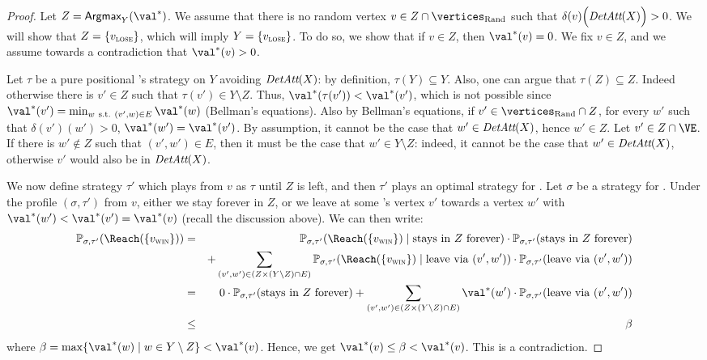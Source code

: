\begin{proof}
  Let $Z = \textsf{Argmax}_Y (\val^*)$. We assume that there is no
  random vertex $v \in Z \cap \Randomvertices$ such that
  $\delta(v)\Big(\textit{DetAtt}(X)\Big)>0$. We will show that $Z =
  \{v_{\textsc{lose}}\}$, which will imply $Y = \{v_{\textsc{lose}}\}$. To do so, we show
  that if $v \in Z$, then $\val^*(v) = 0$.  We fix $v \in Z$, and we
  assume towards a contradiction that $\val^*(v)>0$.

  Let $\tau$ be a pure positional \Adam's strategy on $Y$ avoiding
  $\textit{DetAtt}(X)$: by definition, $\tau(Y) \subseteq Y$. Also, one can
  argue that $\tau(Z) \subseteq Z$. Indeed otherwise there is $v' \in
  Z$ such that $\tau(v') \in Y \setminus Z$. Thus, $\val^*(\tau(v')) <
  \val^*(v')$, which is not possible since $\val^*(v') = \min_{w\
    \text{s.t.}\ (v',w) \in E} \val^*(w)$ (Bellman's equations). Also
  by Bellman's equations, if $v' \in \Randomvertices \cap Z$, for
  every $w'$ such that $\delta(v')(w')>0$, $\val^*(w') =
  \val^*(v')$. By assumption, it cannot be the case that $w' \in
  \textit{DetAtt}(X)$, hence $w' \in Z$.  Let $v' \in Z \cap \Evevertices$. If
  there is $w' \notin Z$ such that $(v',w') \in E$, then it must be
  the case that $w' \in Y \setminus Z$: indeed, it cannot be the case
  that $w' \in \textit{DetAtt}(X)$, otherwise $v'$ would also be in
  $\textit{DetAtt}(X)$.

  We now define strategy $\tau'$ which plays from $v$ as $\tau$ until
  $Z$ is left, and then $\tau'$ plays an optimal strategy for \Adam.
  Let $\sigma$ be a strategy for \Eve. Under the profile
  $(\sigma,\tau')$ from $v$, either we stay forever in $Z$, or we
  leave at some \Eve's vertex $v'$ towards a vertex $w'$ with
  $\val^*(w') < \val^*(v') = \val^*(v)$ (recall the discussion
  above). We can then write:
  \begin{eqnarray*}
    \probm_{\sigma,\tau'}(\Reach(\{\vwin\})) &=&
    \probm_{\sigma,\tau'}(\Reach(\{\vwin\}) \mid \text{stays in}\  Z\
    \text{forever}) \cdot  \probm_{\sigma,\tau'}(\text{stays in}\  Z\
    \text{forever}) \\ 
    && + \sum_{(v',w') \in (Z \times (Y \setminus Z) \cap E)} 
    \probm_{\sigma,\tau'}(\Reach(\{\vwin\}) \mid
    \text{leave via}\  (v',w')) \cdot
    \probm_{\sigma,\tau'}(\text{leave via}\  (v',w')) \\
    & = & 0 \cdot \probm_{\sigma,\tau'}(\text{stays in}\  Z\
    \text{forever}) + \sum_{(v',w') \in (Z \times (Y \setminus Z) \cap
      E)}  \val^*(w') \cdot
    \probm_{\sigma,\tau'}(\text{leave via}\  (v',w')) \\
    & \le & \beta
  \end{eqnarray*}
  where $\beta = \max \{\val^*(w) \mid w \in Y \setminus Z\} <
  \val^*(v)$.  Hence, we get $\val^*(v) \le \beta < \val^*(v)$. This
  is a contradiction.
\end{proof}

